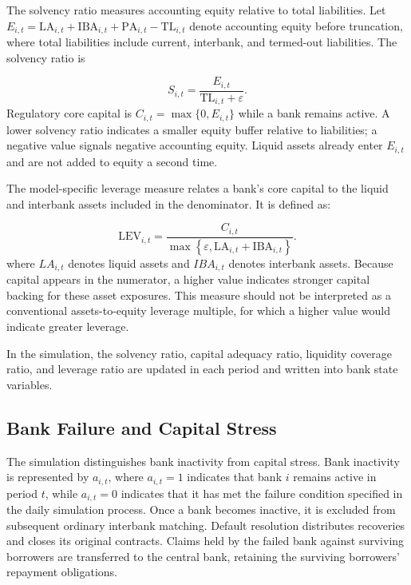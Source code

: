 The solvency ratio measures accounting equity relative to total
 liabilities. Let \(E_{i,t}=\mathrm{LA}_{i,t}+\mathrm{IBA}_{i,t}
 +\mathrm{PA}_{i,t}-\mathrm{TL}_{i,t}\) denote accounting equity before
 truncation, where total liabilities include current, interbank, and
 termed-out liabilities. The solvency ratio is


\begin{equation}
S_{i,t}=\frac{E_{i,t}}{\mathrm{TL}_{i,t}+\varepsilon}\label{eq:solvency}.
\end{equation}
\vspace{-0.4\baselineskip}
\noindent Regulatory core capital is \(C_{i,t}=\max\{0,E_{i,t}\}\)
 while a bank remains active. A lower solvency ratio indicates a smaller
 equity buffer relative to liabilities; a negative value signals negative
 accounting equity. Liquid assets already enter \(E_{i,t}\) and are not
 added to equity a second time.

The model-specific leverage measure relates a bank's core capital to the
liquid and interbank assets included in the denominator. It is defined
as:


\begin{equation}
\mathrm{LEV}_{i,t}=\frac{C_{i,t}}{\max\left\{\varepsilon,\mathrm{LA}_{i,t}+\mathrm{IBA}_{i,t}\right\}}\label{eq:leverage}.
\end{equation}
\vspace{-0.4\baselineskip}
\noindent where \({LA}_{i,t}\) denotes liquid assets and \({IBA}_{i,t}\) denotes
interbank assets. Because capital appears in the numerator, a higher
value indicates stronger capital backing for these asset exposures. This
measure should not be interpreted as a conventional assets-to-equity
leverage multiple, for which a higher value would indicate greater
leverage.

In the simulation, the solvency ratio, capital adequacy ratio, liquidity
coverage ratio, and leverage ratio are updated in each period and
written into bank state variables.

\subsection{Bank Failure and Capital Stress}

The simulation distinguishes bank inactivity from capital stress. Bank
inactivity is represented by \(a_{i,t}\), where \(a_{i,t} = 1\) indicates
that bank \(i\) remains active in period \(t\), while
\(a_{i,t} = 0\) indicates that it has met the failure condition specified
in the daily simulation process. Once a bank becomes inactive, it is
excluded from subsequent ordinary interbank matching. Default resolution
distributes recoveries and closes its original contracts. Claims held by
the failed bank against surviving borrowers are transferred to the central
bank, retaining the surviving borrowers' repayment obligations.

